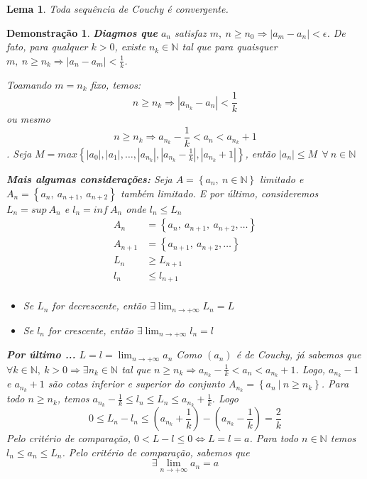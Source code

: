 \documentclass[12pt,openany]{book}
\newtheorem{lemma}{Lema}[section]
\newtheorem{demonstration}{Demonstração}
\begin{document}
\begin{lemma}
Toda sequência de Couchy é convergente. 
\end{lemma}

\begin{demonstration}
\textbf{Diagmos que} $a_n$ satisfaz $m, \ n \geq n_0 \Rightarrow |a_m - a_n| < \epsilon$. De fato, para qualquer $k > 0$, existe $n_k \in \mathds{N}$ tal que para quaisquer $ m, \ n \geq n_k \Rightarrow |a_n - a_m| < \displaystyle{\frac{1}{k}}$.

Toamando $m = n_k$ fixo, temos: $$ n \geq n_k \Rightarrow |a_{n_k} - a_n| < \frac{1}{k} $$ ou mesmo $$ n \geq n_k \Rightarrow a_{n_k} - \frac{1}{k} < a_n < a_{n_k} + 1 $$. Seja $M = max\left\{ |a_0|, |a_1|, \hdots , |a_{n_k}|, |a_{n_k} - \frac{1}{k}|, |a_{n_k} + 1| \right\}$, então $|a_n| \leq M \ \ \forall \ n \in \mathds{N}$

\textbf{Mais algumas considerações:} Seja $A = \left\{ a_n, \ n \in \mathds{N} \right\}$ limitado e $A_n = \left\{ a_n, \ a_{n+1}, \ a_{n+2} \right\}$ também limitado. E por último, consideremos $L_n = sup \ A_n$ e $l_n = inf \ A_n$ onde $l_n \leq L_n$
\begin{align*}
A_n &= \left\{ a_n, \ a_{n+1}, \ a_{n+2}, \hdots \right\} \\
A_{n+1} &= \left\{ a_{n+1}, \ a_{n+2}, \hdots \right\} \\
L_n  &\geq L_{n+1} \\
l_n & \leq l_{n+1} \\
\end{align*}
\begin{itemize}
\item Se $L_n$ for decrescente, então $\displaystyle{\exists \lim_{n \rightarrow +\infty} L_n = L}$
\item Se $l_n$ for crescente, então $\displaystyle{\exists \lim_{n \rightarrow +\infty} l_n = l}$
\end{itemize}
\textbf{Por último ...} $\displaystyle{L = l = \lim_{n \rightarrow +\infty} a_n}$ Como $(a_n)$ é de Couchy, já sabemos que $\forall k \in \mathds{N}, \ k > 0 \Rightarrow \exists n_k \in \mathds{N}$ tal que $n \geq n_k \Rightarrow a_{n_k} - \frac{1}{k} < a_n < a_{n_k} + 1$. Logo, $a_{n_k} - 1 $ e $a_{n_k} + 1 $ são cotas inferior e superior do conjunto $A_{n_k} = \left\{ a_n \ | \ n \geq n_k \right\}$. Para todo $n \geq n_k$, temos $a_{n_k} - \frac{1}{k} \leq l_n \leq L_n \leq a_{n_k} + \frac{1}{k}$. Logo $$ 0 \leq L_n - l_n \leq (a_{n_k} + \frac{1}{k}) - (a_{n_k} - \frac{1}{k}) = \frac{2}{k}$$ Pelo critério de comparação, $ 0 < L - l \leq 0 \Longleftrightarrow L = l = a $. Para todo $n \in \mathds{N}$ temos $ l_n \leq a_n \leq L_n$. Pelo critério de comparação, sabemos que $$ \exists \lim_{n \rightarrow +\infty} a_n = a $$
\end{demonstration}
\end{document}
